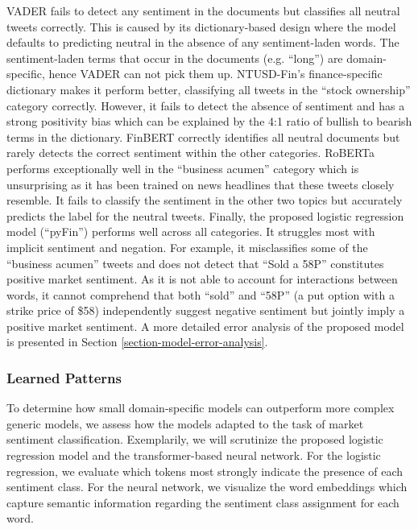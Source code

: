 VADER fails to detect any sentiment in the documents but classifies all neutral tweets correctly. This is caused by its dictionary-based design where the model defaults to predicting neutral in the absence of any sentiment-laden words. The sentiment-laden terms that occur in the documents (e.g. ``long'') are domain-specific, hence VADER can not pick them up. NTUSD-Fin's finance-specific dictionary makes it perform better, classifying all tweets in the ``stock ownership'' category correctly. However, it fails to detect the absence of sentiment and has a strong positivity bias which can be explained by the 4:1 ratio of bullish to bearish terms in the dictionary. FinBERT correctly identifies all neutral documents but rarely detects the correct sentiment within the other categories. RoBERTa performs exceptionally well in the ``business acumen'' category which is unsurprising as it has been trained on news headlines that these tweets closely resemble. It fails to classify the sentiment in the other two topics but accurately predicts the label for the neutral tweets. Finally, the proposed logistic regression model (``pyFin'') performs well across all categories. It struggles most with implicit sentiment and negation. For example, it misclassifies some of the ``business acumen'' tweets and does not detect that ``Sold a 58P'' constitutes positive market sentiment. As it is not able to account for interactions between words, it cannot comprehend that both ``sold'' and ``58P'' (a put option with a strike price of \$58) independently suggest negative sentiment but jointly imply a positive market sentiment. A more detailed error analysis of the proposed model is presented in Section \ref{section-model-error-analysis}.


\subsubsection{Learned Patterns}
\label{section-learned-patterns}
To determine how small domain-specific models can outperform more complex generic models, we assess how the models adapted to the task of market sentiment classification. Exemplarily, we will scrutinize the proposed logistic regression model and the transformer-based neural network. For the logistic regression, we evaluate which tokens most strongly indicate the presence of each sentiment class. For the neural network, we visualize the word embeddings which capture semantic information regarding the sentiment class assignment for each word.

